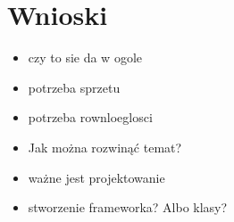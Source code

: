 \section{Wnioski}\label{conclusion}

\begin{itemize}
\item czy to sie da w ogole
\item potrzeba sprzetu
\item potrzeba rownloeglosci
\item Jak można rozwinąć temat?
\item ważne jest projektowanie
\item stworzenie frameworka? Albo klasy?
\end{itemize}
